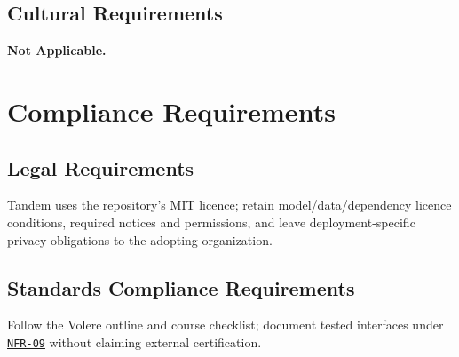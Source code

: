 \documentclass[12pt]{article}
\begin{document}
\subsection{Cultural Requirements}
\textbf{Not Applicable.}


\section{Compliance Requirements}


\subsection{Legal Requirements}
Tandem uses the repository's MIT licence; retain
model/data/dependency licence conditions, required notices and permissions,
and leave deployment-specific privacy obligations to the adopting organization.


\subsection{Standards Compliance Requirements}
Follow the Volere outline and course checklist; document tested interfaces
under \hyperref[req:NFR-09]{\texttt{NFR-09}} without claiming external certification.
\end{document}
